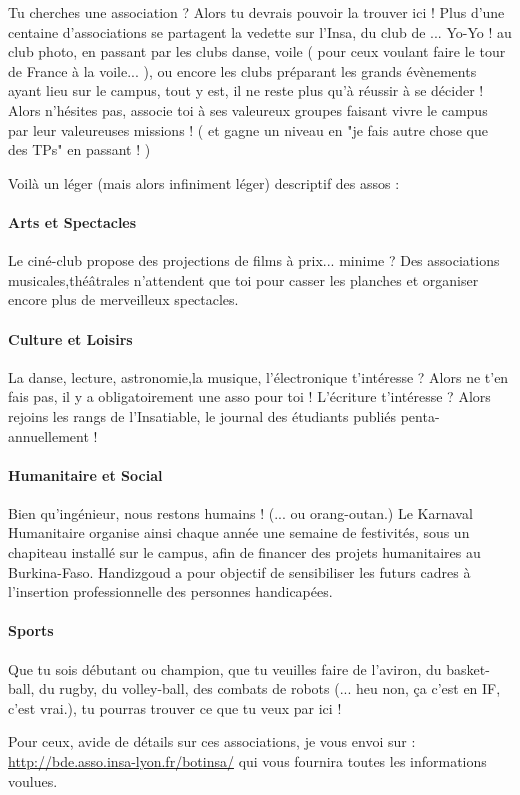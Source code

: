 Tu cherches une association ? Alors tu devrais pouvoir la trouver ici !
Plus d'une centaine d'associations se partagent la vedette sur l'Insa, du club
de ... Yo-Yo ! au club photo, en passant par les clubs danse, voile ( pour ceux
voulant faire le tour de France à la voile... ), ou encore les clubs
préparant les grands évènements ayant lieu sur le campus, tout y est, il ne
reste plus qu'à réussir à se décider !
Alors n'hésites pas, associe toi à ses valeureux groupes faisant vivre le campus
par leur valeureuses missions ! ( et gagne un niveau en "je fais autre chose que
des TPs" en passant ! )

Voilà un léger (mais alors infiniment léger) descriptif des assos :

\paragraph{Arts et Spectacles}
Le ciné-club propose des projections de films à prix... minime ?
Des associations musicales,théâtrales n'attendent que toi pour casser les planches et organiser encore plus de merveilleux spectacles.

\paragraph{Culture et Loisirs}
La danse, lecture, astronomie,la musique, l'électronique t'intéresse ?
Alors ne t'en fais pas, il y a obligatoirement une asso pour toi !
L'écriture t'intéresse ? Alors rejoins les rangs de l'Insatiable, le journal des étudiants publiés penta-annuellement !

\paragraph{Humanitaire et Social}
Bien qu'ingénieur, nous restons humains ! (... ou orang-outan.)
Le Karnaval Humanitaire organise ainsi chaque année une semaine de festivités,
sous un chapiteau installé sur le campus, afin de financer des projets
humanitaires au Burkina-Faso.
Handizgoud a pour objectif de sensibiliser les futurs cadres à l'insertion
professionnelle des personnes handicapées.

\paragraph{Sports}
Que tu sois débutant ou champion, que tu veuilles faire de l'aviron, du
basket-ball, du rugby, du volley-ball, des combats de robots (... heu non, ça
c'est en IF, c'est vrai.), tu pourras trouver ce que tu veux par ici !

Pour ceux, avide de détails sur ces associations, je vous envoi sur :
\url{http://bde.asso.insa-lyon.fr/botinsa/} qui vous fournira toutes les
informations voulues.

